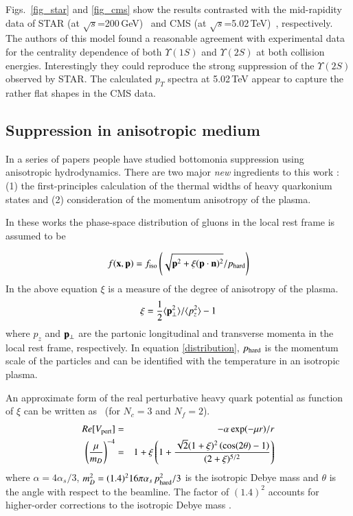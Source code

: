 {Figs.~\ref{fig_star} and \ref{fig_cms} show the results contrasted with the mid-rapidity data of STAR (at
$\sqrt{s}$=200\,GeV)~\cite{Ye:2017qmstar} and CMS
(at $\sqrt{s}$=5.02\,TeV)~\cite{Flores:2017qmcms}, respectively. 
The authors of this model found a reasonable agreement  with experimental data for the centrality dependence of both $\Upsilon(1S)$ and $\Upsilon(2S)$ at both collision energies. Interestingly they could reproduce the strong suppression of
 the $\Upsilon(2S)$ observed by STAR.  
The calculated $p_T$ spectra at 5.02\,TeV appear to capture the rather flat shapes in the CMS data. 



\subsection{Suppression in anisotropic medium}


In a series of papers people have studied bottomonia suppression using anisotropic hydrodynamics. 
There are two major {\it new} ingredients to this work : (1) the first-principles calculation of the thermal widths of heavy quarkonium states 
and (2) consideration of the momentum anisotropy of the plasma. 

In these works the phase-space distribution of gluons in the local rest frame is assumed to be 

\begin{equation} 
f({\bf x},{\bf p}) = f_{\rm iso}\left(\sqrt{{\bf p}^2+ \xi({\bf p}\cdot{\bf n})^2 }  / 
p_{\rm hard} \right) 
\label{distribution}
\end{equation} 
In the above equation $\xi$ is a measure of the degree of anisotropy of the plasma.
\begin{equation}
\xi = \frac{1}{2} \langle 
{\bf p}_\perp^2\rangle/\langle p_z^2\rangle -1
\end{equation} 
where $p_z$ and 
${\bf p}_\perp $ are the partonic longitudinal and transverse momenta in the local
rest frame, respectively. In equation \ref{distribution}, $p_{\rm hard}$ is the momentum  
scale of the particles and can be identified with the temperature
in an isotropic plasma. 

An approximate form of the real perturbative heavy quark potential as function of $\xi$ can be 
written as~\cite{Dumitru:2007hy} (for $N_c=3$ and $N_f=2$). 
\begin{eqnarray}
Re[V_{\rm pert}] &=& - \alpha \exp(-\mu r)/r \nonumber \\
\left(\frac{\mu}{m_D}\right)^{-4} &=&  
1 + \xi\left(1 + \frac{\sqrt{2}(1+\xi)^2\left(\cos(2\theta) - 1 \right)}{(2+ \xi)^{5/2}} \right) 
\label{eq:muparam}
\end{eqnarray}
where $\alpha = 4\alpha_s/3$, $m_D^2 = (1.4)^2 16 \pi \alpha_s  \, p_{\rm hard}^2/3$ is the isotropic
Debye mass and $\theta$ is the angle with respect to the beamline.  
The factor of $(1.4)^2$ accounts for higher-order corrections to the isotropic Debye 
mass \cite{Kaczmarek:2004gv}.

}
